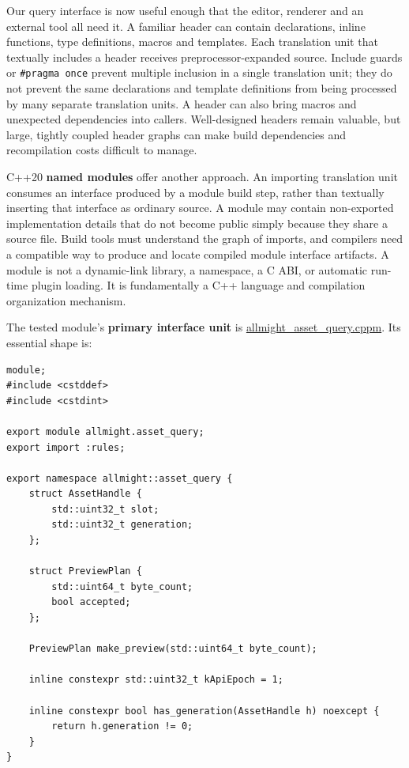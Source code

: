 Our query interface is now useful enough that the editor, renderer and an external tool all need it. A familiar header can contain declarations, inline functions, type definitions, macros and templates. Each translation unit that textually includes a header receives preprocessor-expanded source. Include guards or \texttt{\#pragma\ once} prevent multiple inclusion in a single translation unit; they do not prevent the same declarations and template definitions from being processed by many separate translation units. A header can also bring macros and unexpected dependencies into callers. Well-designed headers remain valuable, but large, tightly coupled header graphs can make build dependencies and recompilation costs difficult to manage.

C++20 \textbf{named modules} offer another approach. An importing translation unit consumes an interface produced by a module build step, rather than textually inserting that interface as ordinary source. A module may contain non-exported implementation details that do not become public simply because they share a source file. Build tools must understand the graph of imports, and compilers need a compatible way to produce and locate compiled module interface artifacts. A module is not a dynamic-link library, a namespace, a C ABI, or automatic run-time plugin loading. It is fundamentally a C++ language and compilation organization mechanism.

The tested module's \textbf{primary interface unit} is \hyperref[source-file-453ba365bb56ed2f6e4c3f8e]{allmight\_asset\_query.cppm}. Its essential shape is:

\begin{verbatim}
module;
#include <cstddef>
#include <cstdint>

export module allmight.asset_query;
export import :rules;

export namespace allmight::asset_query {
    struct AssetHandle {
        std::uint32_t slot;
        std::uint32_t generation;
    };

    struct PreviewPlan {
        std::uint64_t byte_count;
        bool accepted;
    };

    PreviewPlan make_preview(std::uint64_t byte_count);

    inline constexpr std::uint32_t kApiEpoch = 1;

    inline constexpr bool has_generation(AssetHandle h) noexcept {
        return h.generation != 0;
    }
}
\end{verbatim}

